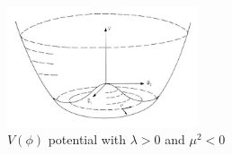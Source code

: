 

\begin{figure}[hb]
  \centering
	\includegraphics[width=0.5\textwidth]{images/mexicanHat.jpg}
  	\caption[Potential]
   	{$V(\phi)$ potential with $\lambda>0$ and $\mu^{2}<0$}
	\label{fig:mexicanHat}
\end{figure}

